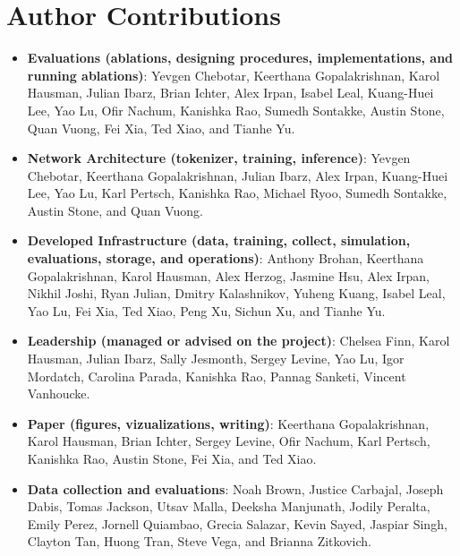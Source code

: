 \documentclass{article} %
\begin{document}
\section{Author Contributions}
\label{sec:app_contributions}


\begin{itemize}
    \item \textbf{Evaluations (ablations, designing procedures, implementations, and running ablations)}: Yevgen Chebotar, Keerthana Gopalakrishnan, Karol Hausman, Julian Ibarz, Brian Ichter, Alex Irpan, Isabel Leal, Kuang-Huei Lee, Yao Lu, Ofir Nachum, Kanishka Rao, Sumedh Sontakke, Austin Stone, Quan Vuong, Fei Xia, Ted Xiao, and Tianhe Yu.
    \item \textbf{Network Architecture (tokenizer, training, inference)}: Yevgen Chebotar, Keerthana Gopalakrishnan, Julian Ibarz, Alex Irpan, Kuang-Huei Lee, Yao Lu, Karl Pertsch, Kanishka Rao, Michael Ryoo, Sumedh Sontakke, Austin Stone, and Quan Vuong.
    \item \textbf{Developed Infrastructure (data, training, collect, simulation, evaluations, storage, and operations)}: Anthony Brohan, Keerthana Gopalakrishnan, Karol Hausman, Alex Herzog, Jasmine Hsu, Alex Irpan, Nikhil Joshi, Ryan Julian, Dmitry Kalashnikov, Yuheng Kuang, Isabel Leal, Yao Lu, Fei Xia, Ted Xiao, Peng Xu, Sichun Xu, and Tianhe Yu.
    \item \textbf{Leadership (managed or advised on the project)}: Chelsea Finn, Karol Hausman, Julian Ibarz, Sally Jesmonth, Sergey Levine, Yao Lu, Igor Mordatch, Carolina Parada, Kanishka Rao, Pannag Sanketi, Vincent Vanhoucke. 
    \item \textbf{Paper (figures, vizualizations, writing)}: Keerthana Gopalakrishnan, Karol Hausman, Brian Ichter, Sergey Levine, Ofir Nachum, Karl Pertsch, Kanishka Rao, Austin Stone, Fei Xia, and Ted Xiao.
    \item \textbf{Data collection and evaluations}: Noah Brown, Justice Carbajal, Joseph Dabis, Tomas Jackson, Utsav Malla, Deeksha Manjunath, Jodily Peralta, Emily Perez, Jornell Quiambao, Grecia Salazar, Kevin Sayed, Jaspiar Singh, Clayton Tan, Huong Tran, Steve Vega, and Brianna Zitkovich.
\end{itemize}
\end{document}
